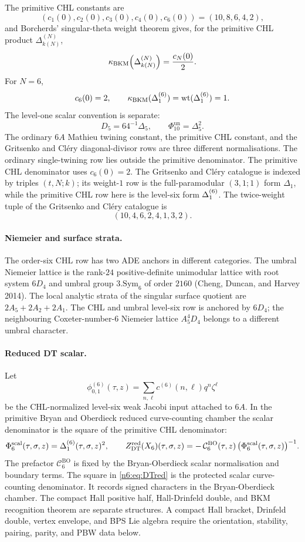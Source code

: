 The primitive CHL constants are
\[
  (c_1(0),c_2(0),c_3(0),c_4(0),c_6(0))
  =(10,8,6,4,2),
\]
and Borcherds' singular-theta weight theorem gives, for the primitive
CHL product $\Delta_{k(N)}^{(N)}$,
\[
  \kappa_{\mathrm{BKM}}\!\left(\Delta_{k(N)}^{(N)}\right)=\frac{c_N(0)}2 .
\]
For $N=6$,
\begin{equation}
  c_6(0)=2,\qquad
  \kappa_{\mathrm{BKM}}(\Delta_{1}^{(6)})=\mathrm{wt}(\Delta_{1}^{(6)})=1 .
  \label{n6:eq:kBKM}
\end{equation}
The level-one scalar convention is separate:
\[
  D_5=64^{-1}\Delta_5,\qquad
  \Phi_{10}^{\mathrm{un}}=\Delta_5^2 .
\]
The ordinary $6A$ Mathieu twining constant, the primitive CHL constant,
and the Gritsenko and Cl\'ery diagonal-divisor rows are three different
normalisations. The ordinary single-twining row lies outside the
primitive denominator. The primitive CHL denominator uses $c_6(0)=2$.
The Gritsenko and Cl\'ery catalogue is indexed by triples $(t,N;k)$; its
weight-$1$ row is the full-paramodular $(3,1;1)$ form $\Delta_1$, while
the primitive CHL row here is the level-six form $\Delta_{1}^{(6)}$. The
twice-weight tuple of the Gritsenko and Cl\'ery catalogue is
\[
  (10,4,6,2,4,1,3,2).
\]

\paragraph{Niemeier and surface strata.}
The order-six CHL row has two ADE anchors in different categories. The
umbral Niemeier lattice is the rank-$24$ positive-definite unimodular
lattice with root system $6D_4$ and umbral group
$3.\mathrm{Sym}_6$ of order $2160$ (Cheng, Duncan, and Harvey 2014).
The local analytic strata of the singular surface quotient are
$2A_5+2A_2+2A_1$. The CHL and umbral level-six row is anchored by
$6D_4$; the neighbouring Coxeter-number-$6$ Niemeier lattice
$A_5^4D_4$ belongs to a different umbral character.

\paragraph{Reduced DT scalar.}
Let
\[
  \phi^{(6)}_{0,1}(\tau,z)
  =
  \sum_{n,\ell}c^{(6)}(n,\ell)q^n\zeta^\ell
\]
be the CHL-normalized level-six weak Jacobi input attached to $6A$. In the
primitive Bryan and Oberdieck reduced curve-counting chamber the scalar
denominator is the square of the primitive CHL denominator:
\begin{equation}
   \Phi^{\mathrm{scal}}_6(\tau,\sigma,z)
   =
   \Delta_{1}^{(6)}(\tau,\sigma,z)^2,
   \qquad
   Z^{\mathrm{red}}_{\mathrm{DT}}(X_6)(\tau,\sigma,z)
   =
   -\,\mathcal C^{\mathrm{BO}}_6(\tau,z)\,
   \bigl(\Phi^{\mathrm{scal}}_6(\tau,\sigma,z)\bigr)^{-1}.
   \label{n6:eq:DTred}
\end{equation}
The prefactor $\mathcal C^{\mathrm{BO}}_6$ is fixed by the
Bryan-Oberdieck scalar normalisation and boundary terms. The square in
\eqref{n6:eq:DTred} is the protected scalar curve-counting denominator.
It records signed characters in the Bryan-Oberdieck chamber. The compact
Hall positive half, Hall-Drinfeld double, and BKM recognition theorem are
separate structures. A compact Hall bracket, Drinfeld double, vertex
envelope, and BPS Lie algebra require the orientation, stability,
pairing, parity, and PBW data below.

